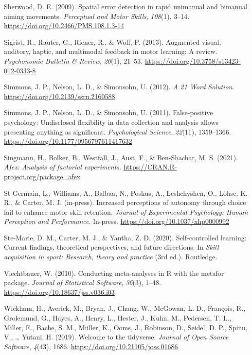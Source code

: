 \documentclass[
  man, donotrepeattitle,floatsintext]{apa7}
\newlength{\cslhangindent}
\newlength{\cslentryspacingunit} %
\newenvironment{CSLReferences}[2] %
 {%
  \setlength{\parindent}{0pt}
  \ifodd #1
  \let\oldpar\par
  \def\par{\hangindent=\cslhangindent\oldpar}
  \fi
  \setlength{\parskip}{#2\cslentryspacingunit}
 }%
 {}
\begin{document}
\begin{CSLReferences}{1}{0}
\leavevmode{}%
Sherwood, D. E. (2009). Spatial error detection in rapid unimanual and bimanual aiming movements. \emph{Perceptual and Motor Skills}, \emph{108}(1), 3--14. \url{https://doi.org/10.2466/PMS.108.1.3-14}

\leavevmode{}%
Sigrist, R., Rauter, G., Riener, R., \& Wolf, P. (2013). Augmented visual, auditory, haptic, and multimodal feedback in motor learning: A review. \emph{Psychonomic Bulletin \& Review}, \emph{20}(1), 21--53. \url{https://doi.org/10.3758/s13423-012-0333-8}

\leavevmode{}%
Simmons, J. P., Nelson, L. D., \& Simonsohn, U. (2012). \emph{A 21 Word Solution}. \url{https://doi.org/10.2139/ssrn.2160588}

\leavevmode{}%
Simmons, J. P., Nelson, L. D., \& Simonsohn, U. (2011). False-positive psychology: Undisclosed flexibility in data collection and analysis allows presenting anything as significant. \emph{Psychological Science}, \emph{22}(11), 1359--1366. \url{https://doi.org/10.1177/0956797611417632}

\leavevmode{}%
Singmann, H., Bolker, B., Westfall, J., Aust, F., \& Ben-Shachar, M. S. (2021). \emph{Afex: Analysis of factorial experiments}. \url{https://CRAN.R-project.org/package=afex}

\leavevmode{}%
St Germain, L., Williams, A., Balbaa, N., Poskus, A., Leshchyshen, O., Lohse, K. R., \& Carter, M. J. (in-press). Increased perceptions of autonomy through choice fail to enhance motor skill retention. \emph{Journal of Experimental Psychology: Human Perception and Performance}. In-press. \url{https://doi.org/10.1037/xhp0000992}

\leavevmode{}%
Ste-Marie, D. M., Carter, M. J., \& Yantha, Z. D. (2020). Self-controlled learning: {Current} findings, theoretical perspectives, and future directions. In \emph{Skill acquisition in sport: Research, theory and practice} (3rd ed.). {Routledge}.

\leavevmode{}%
Viechtbauer, W. (2010). Conducting meta-analyses in {R} with the {metafor} package. \emph{Journal of Statistical Software}, \emph{36}(3), 1--48. \url{https://doi.org/10.18637/jss.v036.i03}

\leavevmode{}%
Wickham, H., Averick, M., Bryan, J., Chang, W., McGowan, L. D., François, R., Grolemund, G., Hayes, A., Henry, L., Hester, J., Kuhn, M., Pedersen, T. L., Miller, E., Bache, S. M., Müller, K., Ooms, J., Robinson, D., Seidel, D. P., Spinu, V., \ldots{} Yutani, H. (2019). Welcome to the {tidyverse}. \emph{Journal of Open Source Software}, \emph{4}(43), 1686. \url{https://doi.org/10.21105/joss.01686}


\end{CSLReferences}
\end{document}
